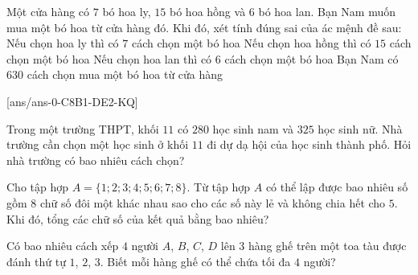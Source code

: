 \begin{ex}%
	Một cửa hàng có $7$ bó hoa ly, $15$ bó hoa hồng và $6$ bó hoa lan. Bạn Nam muốn mua một bó hoa từ cửa hàng đó. Khi đó, xét tính đúng sai của ác mệnh đề sau:
	\choiceTF
	{\True Nếu chọn hoa ly thì có $7$ cách chọn một bó hoa}
	{\True Nếu chọn hoa hồng thì có $15$ cách chọn một bó hoa}
	{\True Nếu chọn hoa lan thì có $6$ cách chọn một bó hoa}
	{Bạn Nam có $630$ cách chọn mua một bó hoa từ cửa hàng}
\end{ex}

[ans/ans-0-C8B1-DE2-KQ]
\caukq
\begin{ex}%
	Trong một trường THPT, khối $11$ có $280$ học sinh nam và $325$ học sinh nữ. Nhà trường cần chọn một học sinh ở khối $11$ đi dự dạ hội của học sinh thành phố. Hỏi nhà trường có bao nhiêu cách chọn?
\end{ex}

\begin{ex}%
	Cho tập hợp $A=\{1;2;3;4;5;6;7;8\}$. Từ tập hợp $A$ có thể lập được bao nhiêu số gồm $8$ chữ số đôi một khác nhau sao cho các số này lẻ và không chia hết cho $5$. Khi đó, tổng các chữ số của kết quả bằng bao nhiêu?
\end{ex}
\begin{ex}%
	Có bao nhiêu cách xếp $4$ người $A$, $B$, $C$, $D$ lên $3$ hàng ghế trên một toa tàu được đánh thứ tự $1$, $2$, $3$. Biết mỗi hàng ghế có thể chứa tối đa $4$ người?
\end{ex}

